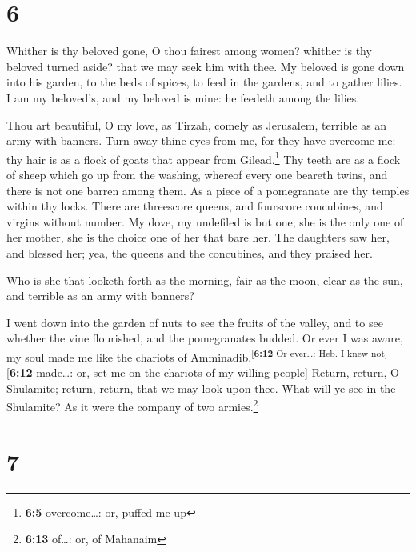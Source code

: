 \hypertarget{section-5}{%
\section{6}\label{section-5}}

 Whither is thy beloved gone, O thou fairest among women?
whither is thy beloved turned aside? that we may seek him with thee.
 My beloved is gone down into his garden, to the beds of
spices, to feed in the gardens, and to gather lilies.  I
am my beloved's, and my beloved is mine: he feedeth among the lilies.

 Thou art beautiful, O my love, as Tirzah, comely as
Jerusalem, terrible as an army with banners.  Turn away
thine eyes from me, for they have overcome me: thy hair is as a flock of
goats that appear from Gilead.\footnote{\textbf{6:5} overcome\ldots: or,
  puffed me up}  Thy teeth are as a flock of sheep which
go up from the washing, whereof every one beareth twins, and there is
not one barren among them.  As a piece of a pomegranate
are thy temples within thy locks.  There are threescore
queens, and fourscore concubines, and virgins without number.
 My dove, my undefiled is but one; she is the only one of
her mother, she is the choice one of her that bare her. The daughters
saw her, and blessed her; yea, the queens and the concubines, and they
praised her.

 Who is she that looketh forth as the morning, fair as
the moon, clear as the sun, and terrible as an army with banners?

 I went down into the garden of nuts to see the fruits of
the valley, and to see whether the vine flourished, and the pomegranates
budded.  Or ever I was aware, my soul made me like the
chariots of Amminadib.\textsuperscript{{[}\textbf{6:12} Or ever\ldots:
Heb. I knew not{]}}{[}\textbf{6:12} made\ldots: or, set me on the
chariots of my willing people{]}  Return, return, O
Shulamite; return, return, that we may look upon thee. What will ye see
in the Shulamite? As it were the company of two armies.\footnote{\textbf{6:13}
  of\ldots: or, of Mahanaim}

\hypertarget{section-6}{%
\section{7}\label{section-6}}

